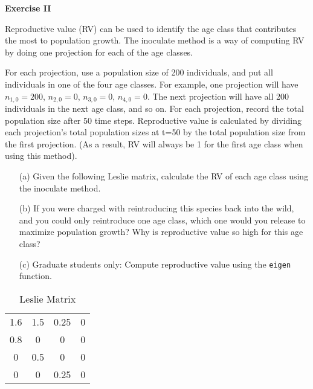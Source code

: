 \documentclass[12pt]{article}\usepackage[]{graphicx}\usepackage[]{color}
\begin{document}
\vspace{12pt}

\clearpage

{\bf Exercise II \\}

Reproductive value (RV) can be used to identify the age class that
contributes the most to population growth. The inoculate method is a
way of computing RV by doing one projection for each of the age
classes.

For each projection, use a population size of 200 individuals, and put
all individuals in one of the four age classes. For example, one
projection will have $n_{1,0}=200$, $n_{2,0}=0$, $n_{3,0}=0$, $n_{4,0}=0$. The next
projection will have all 200 individuals in the next age class, and so
on. For each projection, record the total population size after 50
time steps. Reproductive value is calculated by dividing each
projection's total population sizes at t=50 by the total population
size from the first projection. (As a result, RV will always be 1 for
the first age class when using this method).

\begin{itemize}
  \item[(a)] Given the following Leslie matrix, calculate the RV of each
    age class using the inoculate method.
  \item[(b)] If you were charged with reintroducing this species back
    into the wild, and you could only reintroduce one age class, which
    one would you release to maximize population growth? Why is
    reproductive value so high for this age class?
  \item[(c)] Graduate students only: Compute reproductive value using
    the \texttt{eigen} function.
\end{itemize}

\begin{table}[h]
  \centering
  \caption{Leslie Matrix}
  \begin{tabular}{cccc}
    \hline
    1.6 & 1.5 & 0.25 & 0 \\
    0.8 & 0   & 0    & 0 \\
    0   & 0.5 & 0    & 0 \\
    0   & 0   & 0.25 & 0 \\
    \hline
  \end{tabular}
  \label{tab:A}
\end{table}
\end{document}
